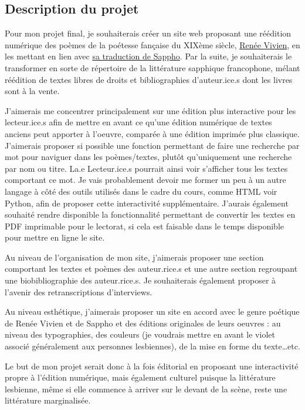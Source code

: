 \documentclass[12pt,french,letterpaper]{article}
\begin{document}
\normalsize{\hypertarget{description-du-projet}{%
\subsection{\texorpdfstring{\textbf{Description du
projet}}{Description du projet}}\label{description-du-projet}}

Pour mon projet final, je souhaiterais créer un site web proposant une
réédition numérique des poèmes de la poétesse fançaise du XIXème siècle,
\href{https://fr.wikipedia.org/wiki/Ren\%C3\%A9e_Vivien}{Renée Vivien},
en les mettant en lien avec
\href{https://fr.wikisource.org/wiki/Sapho_(Vivien)}{sa traduction de
Sappho}. Par la suite, je souhaiterais le transformer en sorte de
répertoire de la littérature sapphique francophone, mélant réédition de
textes libres de droits et bibliographies d'auteur.ice.s dont les livres
sont à la vente.

J'aimerais me concentrer principalement sur une édition plus interactive
pour les lecteur.ice.s afin de mettre en avant ce qu'une édition
numérique de textes anciens peut apporter à l'oeuvre, comparée à une
édition imprimée plus classique. J'aimerais proposer si possible une
fonction permettant de faire une recherche par mot pour naviguer dans
les poèmes/textes, plutôt qu'uniquement une recherche par nom ou titre.
La.e Lecteur.ice.s pourrait ainsi voir s'afficher tous les textes
comportant ce mot. Je vais probablement devoir me former un peu à un
autre langage à côté des outils utilisés dans le cadre du cours, comme
HTML voir Python, afin de proposer cette interactivité supplémentaire.
J'aurais également souhaité rendre disponible la fonctionnalité
permettant de convertir les textes en PDF imprimable pour le lectorat,
si cela est faisable dans le temps disponible pour mettre en ligne le
site.

Au niveau de l'organisation de mon site, j'aimerais proposer une section
comportant les textes et poèmes des auteur.rice.s et une autre section
regroupant une biobibliographie des auteur.rice.s. Je souhaiterais
également proposer à l'avenir des retranscriptions d'interviews.

Au niveau esthétique, j'aimerais proposer un site en accord avec le
genre poétique de Renée Vivien et de Sappho et des éditions originales
de leurs oeuvres : au niveau des typographies, des couleurs (je voudrais
mettre en avant le violet associé généralement aux personnes
lesbiennes), de la mise en forme du texte\ldots etc.

Le but de mon projet serait donc à la fois éditorial en proposant une
interactivité propre à l'édition numérique, mais également culturel
puisque la littérature lesbienne, même si elle commence à arriver sur le
devant de la scène, reste une littérature marginalisée.

}
\end{document}
